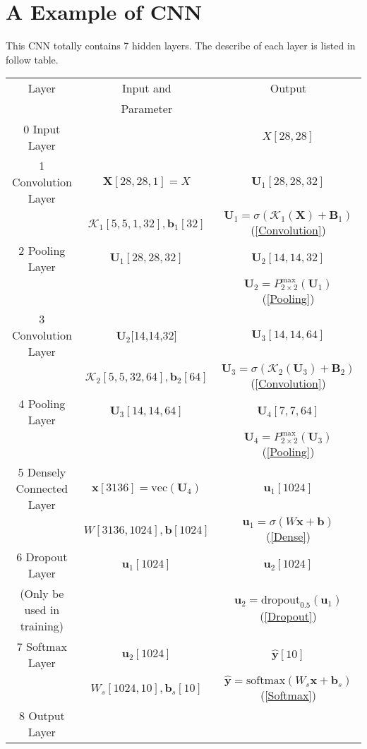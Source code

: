 	\section{A Example of CNN}
	This CNN totally contains 7 hidden layers. The describe of each layer is listed in follow table.
	\newpage
	\begin{table}
		\begin{tabular}{|c|c|c|}\hline
		Layer 						&Input and			&Output	\\
									&Parameter			&\\ \hline
		0 Input Layer    			& 					& $X[28,28]$\\\hline
		1 Convolution Layer 		&$\mathbf X[28,28,1] = X$			&$\mathbf U_1[28,28,32]$\\
        &$\mathcal K_1[5,5,1,32], \mathbf b_1[32]$	&$\mathbf U_1 = \sigma (\mathcal K_1(\mathbf X)+ \mathbf B_1)$ (\ref{Convolution})\\\hline
		2 Pooling Layer 			&$\mathbf U_1[28,28,32]$	&$\mathbf U_2[14,14,32]$\\
		&							&$\mathbf U_2 = P_{2\times 2}^{\max}(\mathbf U_1)$ (\ref{Pooling})\\\hline
		3 Convolution Layer			&$\mathbf U_2$[14,14,32]		&$\mathbf U_3[14,14,64]$\\
		&$\mathcal K_2[5,5,32,64], \mathbf b_2[64]$&$\mathbf U_3 = \sigma (\mathcal K_2(\mathbf U_3)+ \mathbf B_2)$(\ref{Convolution})\\	\hline
		4 Pooling Layer 			&$\mathbf U_3[14,14,64]$		&$\mathbf U_4[7,7,64]$\\
		& 							&$\mathbf U_4 = P_{2\times 2}^{\max}(\mathbf U_3)$(\ref{Pooling})\\\hline
		5 Densely Connected Layer 	&$\mathbf x[3136] = \text{vec}(\mathbf U_4)$ &$\mathbf u_1[1024]$\\
		&$W[3136,1024],\mathbf b[1024]$		&$\mathbf u_1 = \sigma (W\mathbf x +\mathbf b)$(\ref{Dense})\\\hline
		6 Dropout Layer				&$\mathbf u_1[1024]$ 				&$\mathbf u_2[1024]$\\
		(Only be used in training)&					&$\mathbf u_2 = \text{dropout}_{0.5}(\mathbf u_1)$(\ref{Dropout})\\\hline
		7 Softmax Layer				&$\mathbf u_2[1024]$				&$\hat{\mathbf y}[10]$\\
		&$W_s[1024,10],\mathbf b_s[10]$	&$\hat{\mathbf y} = \text{softmax}(W_s\mathbf x +\mathbf b_s)$(\ref{Softmax}) \\\hline
		8 Output Layer				&									&\\ \hline
		\end{tabular}
	\end{table}
	
